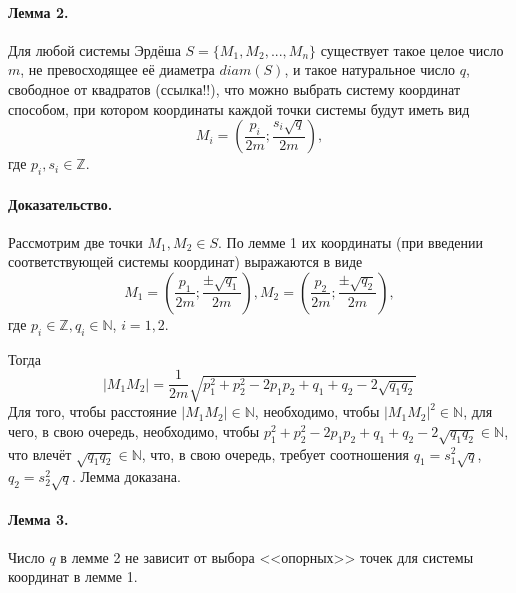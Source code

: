\documentclass[a4paper,14pt]{article} %
\begin{document}
\paragraph{Лемма 2.}

Для любой системы Эрдёша $S=\{M_1, M_2, ..., M_n\}$ существует такое целое число $m$, не превосходящее её диаметра $diam(S)$,
и такое натуральное число $q$, свободное от квадратов (ссылка!!),
что можно выбрать систему координат способом, при котором координаты каждой точки системы будут иметь вид
\begin{equation}
	M_i = \left(
		\frac{p_i}{2m}
		;
		\frac{s_i\sqrt{q}}{2m}
	\right),
\end{equation}
где $p_i, s_i \in \mathbb{Z}$.

\paragraph{Доказательство.}
Рассмотрим две точки $M_1, M_2 \in S$.
По лемме 1 их координаты (при введении соответствующей системы координат) выражаются в виде
\begin{equation}
	M_1 = \left(
		\frac{p_1}{2m}
		;
		\frac{\pm\sqrt{q_1}}{2m}
	\right),
	M_2 = \left(
		\frac{p_2}{2m}
		;
		\frac{\pm\sqrt{q_2}}{2m}
	\right),
\end{equation}
где $p_i \in \mathbb{Z}, q_i \in \mathbb{N}$, $i=1,2$.

Тогда
\begin{equation}
	|M_1 M_2| = \frac{1}{2m} \sqrt{p_1^2 + p_2^2 - 2p_1p_2 + q_1 + q_2 - 2\sqrt{q_1 q_2}}
\end{equation}
Для того, чтобы расстояние $|M_1 M_2| \in \mathbb{N}$, необходимо,
чтобы $|M_1 M_2|^2 \in \mathbb{N}$, для чего, в свою очередь, необходимо, чтобы
$p_1^2 + p_2^2 - 2p_1p_2 + q_1 + q_2 - 2\sqrt{q_1 q_2} \in \mathbb{N}$,
что влечёт $\sqrt{q_1 q_2} \in \mathbb{N}$,
что, в свою очередь, требует соотношения
$q_1 = s_1^2 \sqrt{q}$, $q_2 = s_2^2 \sqrt{q}$.
Лемма доказана.

\paragraph{Лемма 3.}
Число $q$ в лемме 2 не зависит от выбора <<опорных>> точек для системы координат в лемме 1.
\end{document}
